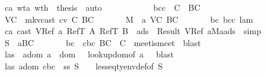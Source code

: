 \begin{isabellebody}
\ \ \ \ \ \ \isamarkupfalse \ ca\ wta{}\ wth\ \isamarkupfalse \ {\isacharquery}thesis\ \isamarkupfalse \ auto\isanewline
\ \ \ \ \isamarkupfalse \isanewline
\ \ \ \ \ \ \isamarkupfalse \ bcc{\isacharcolon}\ {\isachardoublequoteopen}{\isasymnot}\ {\isacharparenleft}C\ {\isasymsqsubseteq}\ BC{\isacharparenright}{\isachardoublequoteclose}\isanewline
\ \ \ \ \ \ \isamarkupfalse \ {\isacharquery}VC\ {\isacharequal}\ {\isachardoublequoteopen}mk{\isacharunderscore}vcast\ cv\ C\ BC{\isachardoublequoteclose}\isanewline
\ \ \ \ \ \ \isamarkupfalse \ {\isacharquery}M{}\ {\isacharequal}\ {\isachardoublequoteopen}{\isacharparenleft}a{\isacharcomma}\ {\isacharquery}VC{\isacharcomma}\ BC{\isacharparenright}{\isacharhash}{\isasymmu}{\isachardoublequoteclose}\isanewline
\ \ \ \ \ \ \isamarkupfalse \ bc\ bcc\ lam\isanewline
\ \ \ \ \ \ \isamarkupfalse \ ca{\isacharcolon}\ {\isachardoublequoteopen}cast\ {\isacharparenleft}VRef\ a{\isacharparenright}\ {\isacharparenleft}RefT\ A{\isacharparenright}\ {\isacharparenleft}RefT\ B{\isacharparenright}\ {\isasymmu}\ ads{}\ {\isacharequal}\ Result\ {\isacharparenleft}VRef\ a{\isacharcomma}{\isacharquery}M{}{\isacharcomma}a{\isacharhash}ads{}{\isacharparenright}{\isachardoublequoteclose}\ \isamarkupfalse \ simp\isanewline
\ \ \ \ \ \ \isamarkupfalse \ {\isacharquery}S{}\ {\isacharequal}\ {\isachardoublequoteopen}{\isacharparenleft}a{\isacharcomma}BC{\isacharparenright}{\isacharhash}{\isasymSigma}{\isachardoublequoteclose}\isanewline
\ \ \ \ \ \ \isamarkupfalse \ bc\ \isamarkupfalse \ cbc{\isacharcolon}\ {\isachardoublequoteopen}BC\ {\isasymsqsubseteq}\ C{\isachardoublequoteclose}\ \isamarkupfalse \ meet{\isacharunderscore}is{\isacharunderscore}meet\ \isamarkupfalse \ blast\isanewline
\ \ \ \ \ \ \isamarkupfalse \ las\ \isamarkupfalse \ adom{\isacharcolon}\ {\isachardoublequoteopen}a\ {\isasymin}\ dom\ {\isasymSigma}{\isachardoublequoteclose}\ \isamarkupfalse \ lookup{\isacharunderscore}dom{\isacharbrackleft}of\ a\ {\isasymSigma}{\isacharbrackright}\ \isamarkupfalse \ blast\isanewline
\ \ \ \ \ \ \isamarkupfalse \ las\ adom\ cbc\ \isamarkupfalse \ ss{}{\isacharcolon}\ {\isachardoublequoteopen}{\isacharquery}S{}\ {\isasymsqsubseteq}\ {\isasymSigma}{\isachardoublequoteclose}\ \isamarkupfalse \ lesseq{\isacharunderscore}tyenv{\isacharunderscore}def{\isacharbrackleft}of\ {\isacharquery}S{}\ {\isasymSigma}{\isacharbrackright}\isanewline

\end{isabellebody}
